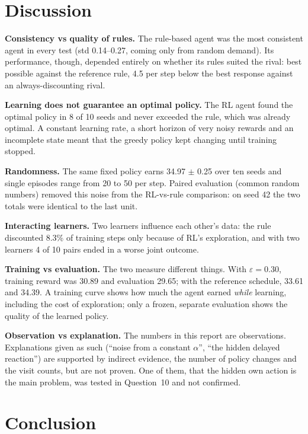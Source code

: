 \documentclass[11pt, a4paper]{article}
\begin{document}
\section{Discussion}

\textbf{Consistency vs quality of rules.} The rule-based agent was the most consistent agent in every test (std 0.14--0.27, coming only from random demand). Its performance, though, depended entirely on whether its rules suited the rival: best possible against the reference rule, 4.5 per step below the best response against an always-discounting rival.

\textbf{Learning does not guarantee an optimal policy.} The RL agent found the optimal policy in 8 of 10 seeds and never exceeded the rule, which was already optimal. A constant learning rate, a short horizon of very noisy rewards and an incomplete state meant that the greedy policy kept changing until training stopped.

\textbf{Randomness.} The same fixed policy earns 34.97 $\pm$ 0.25 over ten seeds and single episodes range from 20 to 50 per step. Paired evaluation (common random numbers) removed this noise from the RL-vs-rule comparison: on seed 42 the two totals were identical to the last unit.

\textbf{Interacting learners.} Two learners influence each other's data: the rule discounted 8.3\% of training steps only because of RL's exploration, and with two learners 4 of 10 pairs ended in a worse joint outcome.

\textbf{Training vs evaluation.} The two measure different things. With $\varepsilon = 0.30$, training reward was 30.89 and evaluation 29.65; with the reference schedule, 33.61 and 34.39. A training curve shows how much the agent earned \emph{while} learning, including the cost of exploration; only a frozen, separate evaluation shows the quality of the learned policy.

\textbf{Observation vs explanation.} The numbers in this report are observations. Explanations given as such (``noise from a constant $\alpha$'', ``the hidden delayed reaction'') are supported by indirect evidence, the number of policy changes and the visit counts, but are not proven. One of them, that the hidden own action is the main problem, was tested in Question~10 and not confirmed.

\section{Conclusion}
\end{document}
